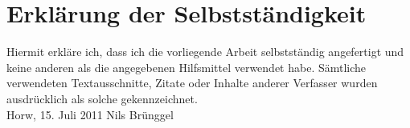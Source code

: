 \thispagestyle{empty}
\section*{Erkl\"arung der Selbstst\"andigkeit}
\thispagestyle{empty}

Hiermit erkl\"are ich, dass ich die vorliegende Arbeit selbstst\"andig angefertigt und keine anderen als die angegebenen Hilfsmittel verwendet habe. S\"amtliche verwendeten Textausschnitte, Zitate oder Inhalte anderer Verfasser wurden ausdr\"ucklich als solche gekennzeichnet.
\vspace{4\baselineskip}\\
Horw, 15. Juli 2011 \hfill Nils Br\"unggel
\vspace{4\baselineskip}\\
